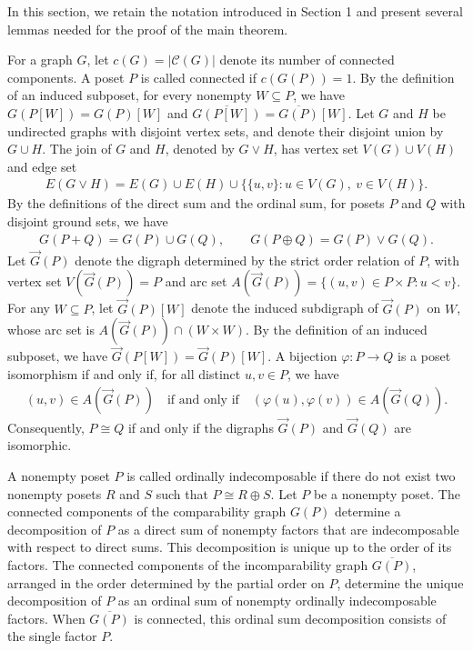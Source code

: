 \documentclass[10pt,a4paper]{amsart}
\begin{document}
In this section, we retain the notation introduced in Section 1
and present several lemmas needed for the proof of the main theorem.

For a graph $G$, let $c(G)=|\mathcal C(G)|$ denote its number of connected components.
A poset $P$ is called connected if $c(G(P))=1$.
By the definition of an induced subposet, for every nonempty $W\subseteq P$, 
we have $G(P[W])=G(P)[W]$ and $\overline{G(P[W])}=\overline{G(P)}[W]$.
Let $G$ and $H$ be undirected graphs with disjoint vertex sets,
and denote their disjoint union by $G\cup H$.
The join of $G$ and $H$, denoted by $G\vee H$, has vertex set $V(G)\cup V(H)$ and edge set
\begin{eqnarray*}
E(G\vee H)
=E(G)\cup E(H)\cup
\bigl\{\{u,v\}:u\in V(G),\ v\in V(H)\bigr\}.
\end{eqnarray*}
By the definitions of the direct sum and the ordinal sum,
for posets $P$ and $Q$ with disjoint ground sets, we have
\begin{eqnarray}\label{eq:graph-sums}
G(P+Q)=G(P)\cup G(Q),\qquad
G(P\oplus Q)=G(P)\vee G(Q).
\end{eqnarray}
Let $\vec G(P)$ denote the digraph determined by the strict order relation of $P$,
with vertex set $V(\vec G(P))=P$ and arc set $A(\vec G(P))=\{(u,v)\in P\times P:u<v\}$.
For any $W\subseteq P$, let $\vec G(P)[W]$ denote the induced subdigraph of $\vec G(P)$ on $W$,
whose arc set is $A(\vec G(P))\cap(W\times W)$.
By the definition of an induced subposet, we have $\vec G(P[W])=\vec G(P)[W]$.
A bijection $\varphi:P\to Q$ is a poset isomorphism if and only if, 
for all distinct $u,v\in P$, we have
\begin{eqnarray*}
(u,v)\in A(\vec G(P))
\quad\text{if and only if}\quad
(\varphi(u),\varphi(v))\in A(\vec G(Q)).
\end{eqnarray*}
Consequently, $P\cong Q$ if and only if the digraphs $\vec G(P)$ and $\vec G(Q)$ are isomorphic.

A nonempty poset $P$ is called ordinally indecomposable 
if there do not exist two nonempty posets $R$ and $S$ such that $P\cong R\oplus S$.
Let $P$ be a nonempty poset.
The connected components of the comparability graph $G(P)$ 
determine a decomposition of $P$ as a direct sum of nonempty factors
that are indecomposable with respect to direct sums.
This decomposition is unique up to the order of its factors.
The connected components of the incomparability graph $\overline{G(P)}$, 
arranged in the order determined by the partial order on $P$, 
determine the unique decomposition of $P$ as an ordinal sum of nonempty ordinally indecomposable factors.
When $\overline{G(P)}$ is connected, this ordinal sum decomposition consists of the single factor $P$.
\end{document}
